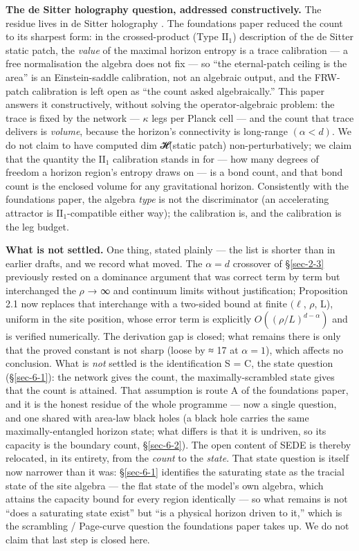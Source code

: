 \documentclass[aps,prd,preprint,nofootinbib,superscriptaddress]{revtex4-2}
\begin{document}
\textbf{The de Sitter holography question, addressed constructively.}
The residue lives in de Sitter holography \citep{Strominger:2001pn}. The
foundations paper reduced the count to its sharpest form: in the
crossed-product (Type \(\mathrm{II}_{1}\)) description of the de Sitter
static patch, the \emph{value} of the maximal horizon entropy is a trace
calibration --- a free normalisation the algebra does not fix --- so
``the eternal-patch ceiling is the area'' is an Einstein-saddle
calibration, not an algebraic output, and the FRW-patch calibration is
left open as ``the count asked algebraically.'' This paper answers it
constructively, without solving the operator-algebraic problem: the
trace is fixed by the network --- \(\kappa\) legs per Planck cell ---
and the count that trace delivers is \emph{volume}, because the
horizon's connectivity is long-range \((\alpha  < d)\). We do not claim
to have computed dim 𝓗(static patch) non-perturbatively; we claim that
the quantity the \(\mathrm{II}_{1}\) calibration stands in for --- how
many degrees of freedom a horizon region's entropy draws on --- is a
bond count, and that bond count is the enclosed volume for any
gravitational horizon. Consistently with the foundations paper, the
algebra \emph{type} is not the discriminator (an accelerating attractor
is \(\mathrm{II}_{1}\)-compatible either way); the calibration is, and
the calibration is the leg budget.

\textbf{What is not settled.} One thing, stated plainly --- the list is
shorter than in earlier drafts, and we record what moved. The
\(\alpha  = d\) crossover of §\ref{sec-2-3} previously rested on a
dominance argument that was correct term by term but interchanged the
\(\rho\) → ∞ and continuum limits without justification; Proposition 2.1
now replaces that interchange with a two-sided bound at finite
\((\ell\), \(\rho\), L), uniform in the site position, whose error term
is explicitly \(O((\rho /L)^{d-\alpha })\) and is verified numerically.
The derivation gap is closed; what remains there is only that the proved
constant is not sharp (loose by ≈ 17 at \(\alpha  = 1\)), which affects
no conclusion. What is \emph{not} settled is the identification S = C,
the state question (§\ref{sec-6-1}): the network gives the count, the
maximally-scrambled state gives that the count is attained. That
assumption is route A of the foundations paper, and it is the honest
residue of the whole programme --- now a single question, and one shared
with area-law black holes (a black hole carries the same
maximally-entangled horizon state; what differs is that it is undriven,
so its capacity is the boundary count, §\ref{sec-6-2}). The open content
of SEDE is thereby relocated, in its entirety, from the \emph{count} to
the \emph{state}. That state question is itself now narrower than it
was: §\ref{sec-6-1} identifies the saturating state as the tracial state
of the site algebra --- the flat state of the model's own algebra, which
attains the capacity bound for every region identically --- so what
remains is not ``does a saturating state exist'' but ``is a physical
horizon driven to it,'' which is the scrambling / Page-curve question
the foundations paper takes up. We do not claim that last step is closed
here.
\end{document}
